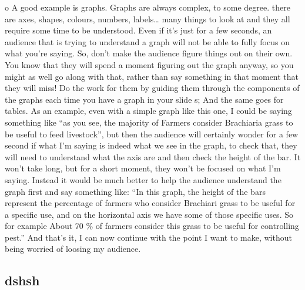 \documentclass[
]{book}
\begin{document}
o A good example is graphs. Graphs are always complex, to some degree. there are axes, shapes, colours, numbers, labels\ldots{} many things to look at and they all require some time to be understood. Even if it's just for a few seconds, an audience that is trying to understand a graph will not be able to fully focus on what you're saying. So, don't make the audience figure things out on their own. You know that they will spend a moment figuring out the graph anyway, so you might as well go along with that, rather than say something in that moment that they will miss! Do the work for them by guiding them through the components of the graphs each time you have a graph in your slide s; And the same goes for tables. As an example, even with a simple graph like this one, I could be saying something like ``as you see, the majority of Farmers consider Brachiaria grass to be useful to feed livestock'', but then the audience will certainly wonder for a few second if what I'm saying is indeed what we see in the graph, to check that, they will need to understand what the axis are and then check the height of the bar. It won't take long, but for a short moment, they won't be focused on what I'm saying. Instead it would be much better to help the audience understand the graph first and say something like: ``In this graph, the height of the bars represent the percentage of farmers who consider Brachiari grass to be useful for a specific use, and on the horizontal axis we have some of those specific uses. So for example About 70 \% of farmers consider this grass to be useful for controlling pest.'' And that's it, I can now continue with the point I want to make, without being worried of loosing my audience.

\hypertarget{dshsh}{%
\subsection{dshsh}\label{dshsh}}
\end{document}

